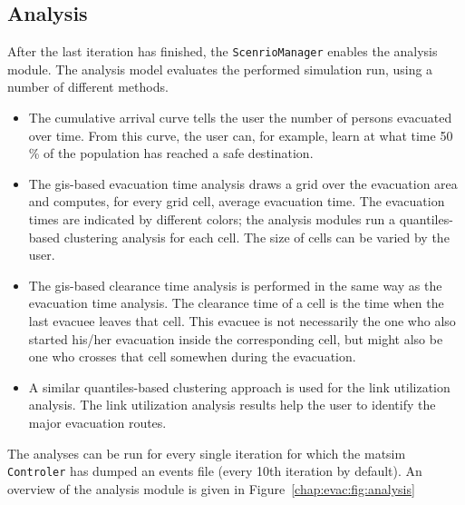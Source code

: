 \subsection{Analysis}
After the last iteration has finished, the \lstinline|ScenrioManager| enables the analysis module. The analysis model evaluates the performed simulation run, using a number of different methods. 
\begin{itemize}\styleItemize
\item The cumulative arrival curve tells the user the number of persons evacuated over time. From this curve, the user can, for example, learn at what time 50\,\% of the population has reached a safe destination.
\item The \gls{gis}-based evacuation time analysis draws a grid over the evacuation area and computes, for every grid cell, average evacuation time. The evacuation times are indicated by different colors; the analysis modules run a quantiles-based clustering analysis for each cell. The size of cells can be varied  by the user.
\item The \gls{gis}-based clearance time analysis is performed in the same way as the evacuation time  analysis. The clearance time of a cell is the time when the last evacuee leaves that cell. This evacuee is not necessarily the one who also started his/her evacuation inside the corresponding cell, but might also be one who crosses that cell somewhen during the evacuation.
\item A similar quantiles-based clustering approach is used for the link utilization analysis. The link utilization analysis results help the user to identify the major evacuation routes.
\end{itemize}
The analyses can be run for every single iteration for which the \gls{matsim} \lstinline|Controler| has dumped an events file (every 10th iteration by default). An overview of the analysis module is given in Figure~\ref{chap:evac:fig:analysis}


